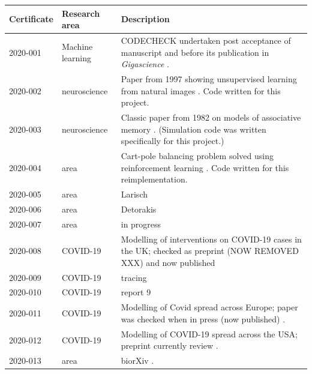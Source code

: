 \documentclass[12pt]{article}
\begin{document}
\begin{table}
  \centering

  \begin{tabular}{llp{11cm}}
    \toprule
    Certificate & Research area & Description \\ \midrule
    2020-001 \cite{cert-2020-001} &
    Machine learning & CODECHECK undertaken post acceptance of
    manuscript and before its publication in \textit{Gigascience}
    \cite{Piccolo2020-lo}. \\
    2020-002  \cite{cert-2020-002} & neuroscience & Paper from 1997
 showing unsupervised learning from natural images \cite{Hancock1992-mp}.
 Code written for this project. \\
    2020-003  \cite{cert-2020-003} & neuroscience &  Classic paper
                                                     from 1982 on
                                                     models of
                                                     associative
                                                     memory
                                                     \cite{Hopfield1982-mz}.
    (Simulation code was written specifically for this project.)\\
    2020-004  \cite{cert-2020-004} & area & Cart-pole balancing problem solved using reinforcement learning \cite{Barto1983-rg}.  Code written for this reimplementation.\\
    2020-005  \cite{cert-2020-005} & area & Larisch \\
    2020-006  \cite{cert-2020-006} & area & Detorakis \\
    2020-007  \cite{cert-2020-007} & area & in progress \\
    2020-008  \cite{cert-2020-008} & COVID-19 & Modelling of
    interventions on COVID-19 cases in the UK; checked as preprint (NOW REMOVED XXX)
    and now published \cite{Davies2020-vj} \\
    2020-009  \cite{cert-2020-009} & COVID-19 & tracing \\
    2020-010  \cite{cert-2020-010} & COVID-19 & report 9 \\
    2020-011  \cite{cert-2020-011} & COVID-19 & Modelling of Covid
    spread across Europe;  paper was checked when in press (now  published) \cite{Flaxman2020-yb}. \\
    2020-012  \cite{cert-2020-012} & COVID-19 & Modelling of COVID-19 spread across the USA; preprint currently review \cite{Unwin2020}. \\
    2020-013  \cite{cert-2020-013} & area & biorXiv \cite{Spitschan2020.06.02.129502}. \\

\end{tabular}
\end{table}
\end{document}
